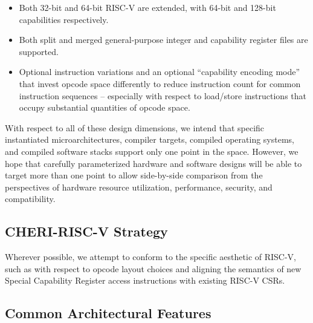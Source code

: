 \begin{itemize}
\item Both 32-bit and 64-bit RISC-V are extended, with 64-bit and 128-bit
  capabilities respectively.

\item Both split and merged general-purpose integer and capability register
  files are supported.

%

\item Optional instruction variations and an optional ``capability encoding
  mode'' that
  invest opcode space differently to reduce instruction count for common
  instruction sequences -- especially with respect to load/store instructions
  that occupy substantial quantities of opcode space.
\end{itemize}

With respect to all of these design dimensions, we intend that specific
instantiated microarchitectures, compiler targets, compiled operating systems,
and compiled software stacks support only one point in the space.
However, we hope that carefully parameterized hardware and software designs
will be able to target more than one point to allow side-by-side comparison
from the perspectives of hardware resource utilization, performance, security,
and compatibility.

\subsection{CHERI-RISC-V Strategy}

Wherever possible, we attempt to conform to the specific aesthetic of RISC-V,
such as with respect to opcode layout choices and aligning the semantics of
new Special Capability Register access instructions with existing RISC-V CSRs.


\subsection{Common Architectural Features}

